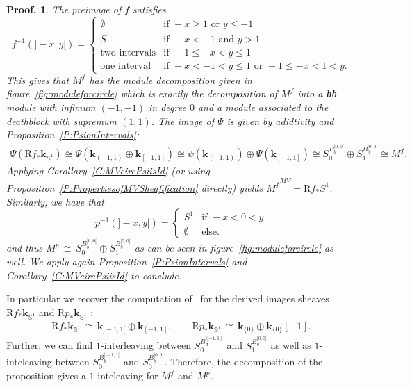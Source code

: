\documentclass[a4paper, english, 11pt]{article}
\newcommand{\kk}[0]{\textbf{k}}
\newcommand{\0}{\vec{0}}
\newcommand{\Rr}[0]{\text{R}}
\newtheorem*{pf}{Proof.} }
\begin{document}
\begin{pf}
 The preimage of $f$ satisfies 
 $$f^{-1}(]-x,y[) =\left\{ \begin{array}{ll} \emptyset & \mbox{if } -x\geqslant 1 \mbox{ or } y\leqslant -1\\
 S^1 & \mbox{if } -x<-1 \mbox{ and } y>1 \\
 \mbox{two intervals} & \mbox{if } -1\leqslant -x <y \leqslant 1\\
 \mbox{one interval} & \mbox{if } -x<-1<y\leqslant 1 \mbox{ or } -1\leqslant -x <1<
 y.
 \end{array}\right. $$
 This gives that $M^f$ has the module decomposition given in figure~\eqref{fig:moduleforcircle} which is exactly the decomposition of $M^f$ into a \textbf{bb}$^{-}$ module with infimum $(-1,-1)$ in degree $0$ and a module associated to the deathblock with supremum $(1,1)$. 
 The image of $\Psi$ is  given by adidtivity and Proposition~\ref{P:PsionIntervals}:
 \begin{multline*}\Psi(\Rr f_*\kk_{\mathbb{S}^1} ) \cong \Psi( \kk_{(-1,1)} \oplus \kk_{[-1,1]}) \cong \psi(\kk_{(-1,1)}) \oplus \Psi(\kk_{[-1,1]}) \cong 
 S_0^{B_b^{]0,0[}}\oplus S_1^{B_b^{]0,0[}} \cong M^f.
 \end{multline*}
 Applying Corollary~\ref{C:MVcircPsiisId} (or using Proposition~\ref{P:PropertiesofMVSheafification} directly) yields $\overline{M^f}^{MV} =\Rr f_* S^1$.
Similarly, we have that 
$$p^{-1}(]-x,y[) =\left\{ \begin{array}{ll} S^1 & \mbox{if } -x<0<y \\
                           \emptyset & \mbox{else}.
                          \end{array}\right.
 $$
 and thus $M^p \, \cong\, S_0^{B_b^{]0,0[}}\oplus S_1^{B_b^{]0,0[}}$ as can be seen in figure~\eqref{fig:moduleforcircle} as well.
We apply again Proposition~\ref{P:PsionIntervals} and Corollary~\ref{C:MVcircPsiisId} to conclude.
\end{pf}
In particular we recover the computation of~\cite{Berk18} for the derived images sheaves 
$\Rr f_*\kk_{\mathbb{S}^1}$  and $\Rr p_*\kk_{\mathbb{S}^1}$ :
\begin{eqnarray}\label{eq:RfandRpofcircle}
 \Rr f_*\kk_{\mathbb{S}^1} \,\cong\, \kk_{]-1,1[} \oplus \kk_{[-1,1]}, \qquad 
 \Rr p_* \kk_{\mathbb{S}^1} \,\cong \,\kk_{\{0\}} \oplus \kk_{\{0\}}[-1].
\end{eqnarray}
Further,  we can find $1$-interleaving between $S_0^{B_d^{[-1,1]}} $ and $S_1^{B_b^{]0,0[}}$ as well as $1$-inteleaving between $S_0^{B_b^{]-1,1[}}$ and $S_0^{B_b^{]0,0[}}$. Therefore,
the decomposition of the proposition gives a $1$-inteleaving for $M^f$ and $M^p$.
\end{document}
